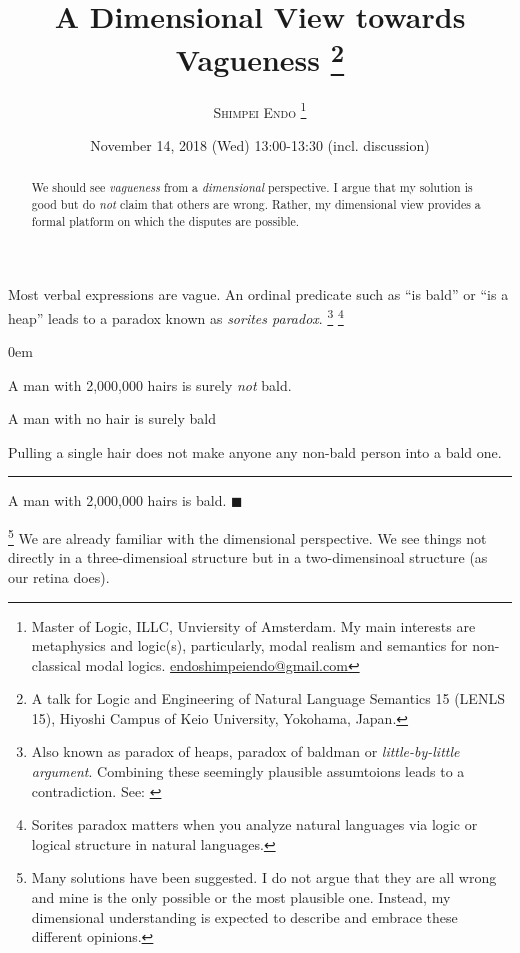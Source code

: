 \documentclass{tufte-handout}
\title{{\bf{A Dimensional View towards Vagueness} } %
\thanks{A talk for Logic and Engineering of Natural Language Semantics 15 (LENLS 15), Hiyoshi Campus of Keio University, Yokohama, Japan. }
}
\author{\textsc{Shimpei Endo
\thanks{Master of Logic, ILLC, Unviersity of Amsterdam.
My main interests are metaphysics and logic(s), particularly, modal realism and semantics for non-classical modal logics.
\Letter \url{endoshimpeiendo@gmail.com}
}
}
}
\date{November 14, 2018 (Wed) 13:00-13:30 (incl. discussion)} %
\begin{document}
\maketitle %

\begin{abstract}
We should see \emph{vagueness} from a \emph{dimensional} perspective.
I argue that my solution is good but do \emph{not} claim that others are wrong.
Rather, my dimensional view provides a formal platform on which the disputes are possible.
\end{abstract}

Most verbal expressions are vague.
 An ordinal predicate such as ``is bald'' or ``is a heap'' leads to a paradox known as \emph{sorites paradox}.
\footnote{Also known as paradox of heaps, paradox of baldman or \emph{little-by-little argument}. Combining these seemingly plausible assumtoions leads to a contradiction. See:
\cite{Hyde2011-HYDTSP}
}
\footnote{Sorites paradox matters when you analyze natural languages via logic or logical structure in natural languages. }


\begin{description}
\itemsep0em

\item	[Obviously non-bald case:] A man with 2,000,000 hairs is surely \emph{not} bald.

\item	[Obviously bald case:] A man with no hair is surely bald

\item	[Tolerance Principle:]
Pulling a single hair does not make anyone any non-bald person into a bald one.
\begin{spacing}{0}

\noindent\rule{10cm}{0.4pt}
\end{spacing}

\item [Unwelcome conclusion:]
A man with 2,000,000 hairs is bald.
$\blacksquare$

\end{description}

\footnote{Many solutions have been suggested.
I do not argue that they are all wrong and mine is the only possible or the most plausible one. Instead, my dimensional understanding is expected to describe and embrace these different opinions.}
We are already familiar with the dimensional perspective.
We see things not directly in a three-dimensioal structure but in a two-dimensinoal structure (as our retina does).
\end{document}
